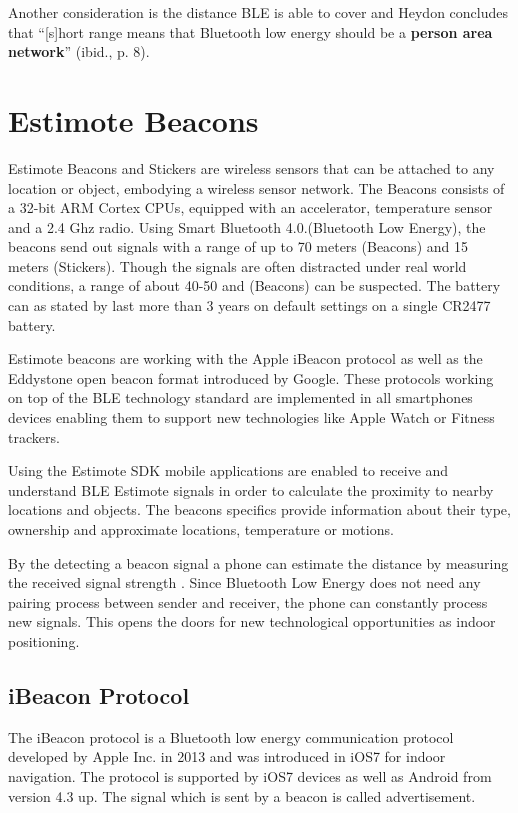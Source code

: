 Another consideration is the distance BLE is able to cover and Heydon concludes that \enquote{[s]hort range means that Bluetooth low energy should be a \textbf{person area network}} (ibid., p. 8).


\vspace{0.5cm}

\section{Estimote Beacons}

Estimote Beacons and Stickers are wireless sensors that can be attached to any location or object, embodying a wireless sensor network. The Beacons consists of a 32-bit ARM Cortex CPUs, equipped with an accelerator, temperature sensor and a 2.4 Ghz radio. Using Smart Bluetooth 4.0.(Bluetooth Low Energy), the beacons send out signals with a range of up to 70 meters (Beacons) and 15 meters (Stickers). Though the signals are often distracted under real world conditions, a range of about 40-50 and (Beacons) can be suspected. The battery can as stated by \cite{Estimote} last more than 3 years on default settings on a single CR2477 battery.

Estimote beacons are working with the Apple iBeacon protocol as well as the Eddystone  open beacon format introduced by Google. These protocols working on top of the BLE technology standard are implemented in all smartphones devices enabling them to support new technologies like Apple Watch or Fitness trackers.

Using the Estimote SDK \cite{Estimote} mobile applications are enabled to receive and understand BLE Estimote signals in order to calculate the proximity to nearby locations and objects. The beacons specifics provide information about their type, ownership and approximate locations, temperature or motions.

By the detecting a beacon signal a phone can estimate the distance by measuring the received signal strength \cite{Estimote}. Since Bluetooth Low Energy does not need any pairing process between sender and receiver, the phone can constantly process new signals. This opens the doors for new technological opportunities as indoor positioning.


\subsection{iBeacon Protocol}

The iBeacon protocol is a Bluetooth low energy communication protocol developed by Apple Inc. in 2013 and was introduced in iOS7 for indoor navigation. The protocol is supported by iOS7 devices as well as Android from version 4.3 up. The signal which is sent by a beacon is called advertisement.

